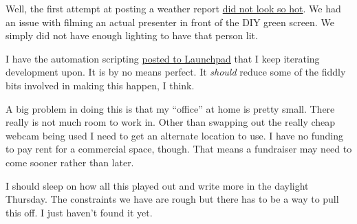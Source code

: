Well, the first attempt at posting a weather report
\href{https://coyote.works/2023/weather-report-for-january-11.html}{did
not look so hot}. We had an issue with filming an actual presenter in
front of the DIY green screen. We simply did not have enough lighting to
have that person lit.

I have the automation scripting
\href{https://code.launchpad.net/~skellat/+git/show-prep-scripts}{posted
to Launchpad} that I keep iterating development upon. It is by no means
perfect. It \emph{should} reduce some of the fiddly bits involved in
making this happen, I think.

A big problem in doing this is that my ``office'' at home is pretty
small. There really is not much room to work in. Other than swapping out
the really cheap webcam being used I need to get an alternate location
to use. I have no funding to pay rent for a commercial space, though.
That means a fundraiser may need to come sooner rather than later.

I should sleep on how all this played out and write more in the daylight
Thursday. The constraints we have are rough but there has to be a way to
pull this off. I just haven't found it yet.
